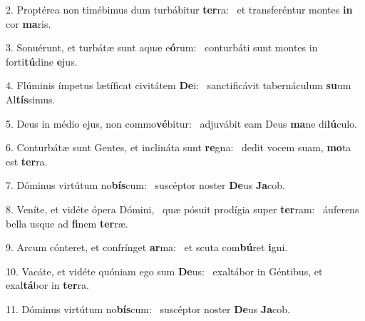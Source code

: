 2. Proptérea non timébimus dum turbábitur \textbf{ter}ra: \ast\  et transferéntur montes \textbf{in} cor \textbf{ma}ris.\

3. Sonuérunt, et turbátæ sunt aquæ e\textbf{ó}rum: \ast\  conturbáti sunt montes in forti\textbf{tú}dine \textbf{e}jus.\

4. Flúminis ímpetus lætíficat civitátem \textbf{De}i: \ast\  sanctificávit tabernáculum \textbf{su}um Al\textbf{tís}simus.\

5. Deus in médio ejus, non commo\textbf{vé}bitur: \ast\  adjuvábit eam Deus \textbf{ma}ne di\textbf{lú}culo.\

6. Conturbátæ sunt Gentes, et inclináta sunt \textbf{re}gna: \ast\  dedit vocem suam, \textbf{mo}ta est \textbf{ter}ra.\

7. Dóminus virtútum no\textbf{bís}cum: \ast\  suscéptor noster \textbf{De}us \textbf{Ja}cob.\

8. Veníte, et vidéte ópera Dómini, \dag\  quæ pósuit prodígia super \textbf{ter}ram: \ast\  áuferens bella usque ad \textbf{fi}nem \textbf{ter}ræ.\

9. Arcum cónteret, et confrínget \textbf{ar}ma: \ast\  et scuta com\textbf{bú}ret \textbf{i}gni.\

10. Vacáte, et vidéte quóniam ego sum \textbf{De}us: \ast\  exaltábor in Géntibus, et exal\textbf{tá}bor in \textbf{ter}ra.\

11. Dóminus virtútum no\textbf{bís}cum: \ast\  suscéptor noster \textbf{De}us \textbf{Ja}cob.\

